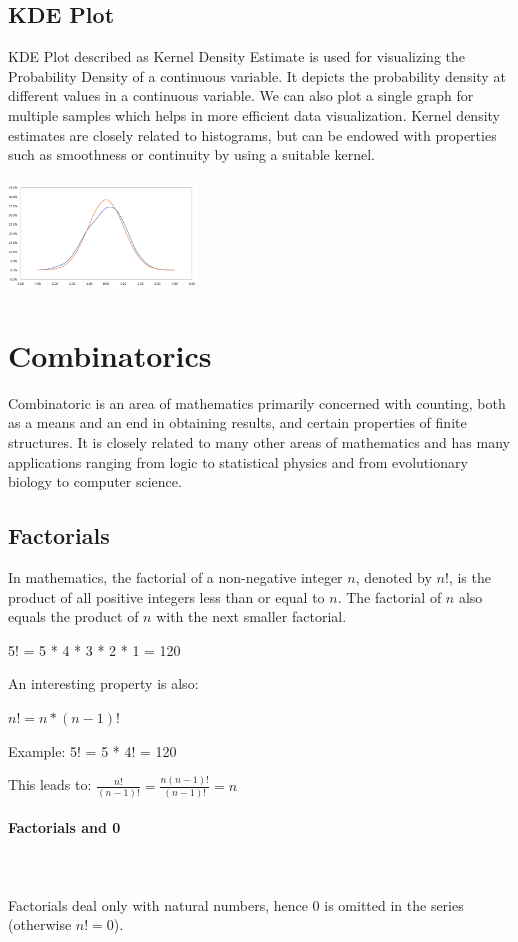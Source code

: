 \documentclass{article}
\begin{document}
\subsection{KDE Plot}

KDE Plot described as Kernel Density Estimate is used for visualizing the Probability Density of a continuous variable. It depicts the probability density at different values in a continuous variable. We can also plot a single graph for multiple samples which helps in more efficient data visualization.
Kernel density estimates are closely related to histograms, but can be endowed with properties such as smoothness or continuity by using a suitable kernel.

\includegraphics[width=5cm, height=3cm]{kde_chart}
\clearpage

\section{Combinatorics}
Combinatoric is an area of mathematics primarily concerned with counting, both as a means and an end in obtaining results, and certain properties of finite structures. It is closely related to many other areas of mathematics and has many applications ranging from logic to statistical physics and from evolutionary biology to computer science.

\subsection{Factorials}
In mathematics, the factorial of a non-negative integer $n$, denoted by $n!$, is the product of all positive integers less than or equal to $n$. The factorial of $n$ also equals the product of $n$ with the next smaller factorial.

5! = 5 * 4 * 3 * 2 * 1 = 120

An interesting property is also:

$n! = n * (n-1)!$

Example:
5! = 5 * 4! = 120

This leads to:
$\frac{n!}{(n-1)!} = \frac{n(n-1)!}{(n-1)!} = n$

\paragraph{Factorials and 0}\mbox{} \\
\mbox{} \\
Factorials deal only with natural numbers, hence 0 is omitted in the series (otherwise $n! = 0$).
\end{document}
